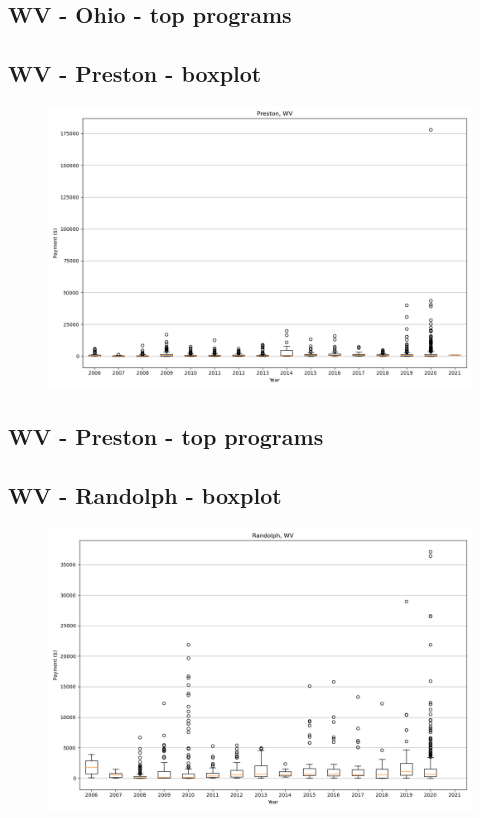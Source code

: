 \subsection*{WV - Ohio - top programs}

\newpage
\subsection*{WV - Preston - boxplot}
\begin{figure}[h]
\centering
\includegraphics[width=7in]{../output/boxplots/counties/Preston-WV_boxplot.png}
\end{figure}


\subsection*{WV - Preston - top programs}

\newpage
\subsection*{WV - Randolph - boxplot}
\begin{figure}[h]
\centering
\includegraphics[width=7in]{../output/boxplots/counties/Randolph-WV_boxplot.png}
\end{figure}


